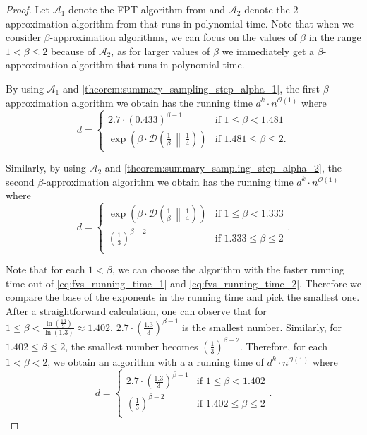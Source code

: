 \documentclass[letterpaper,11pt]{article}
\newcommand{\1}[1]{\mathds{1}\left[#1\right]}
\newcommand{\D}[2]{\mathcal{D}\left(#1\, \middle\|\,#2 \right)}
\newcommand{\Oh}{\mathcal{O}}
\begin{document}
\begin{proof}
	Let $\mathcal{A}_1$ denote the FPT algorithm from \cite{liDetectingFeedbackVertex2022} and $\mathcal{A}_2$ denote the 2-approximation algorithm from \cite{bafna2ApproximationAlgorithmUndirected1999} that runs in polynomial time.
	Note that when we consider $\beta$-approximation algorithms, we can focus on the values of
	$\beta$ in the range $1 < \beta \leq 2$ because of $\mathcal{A}_2$,
	as for larger values of $\beta$ we immediately get a $\beta$-approximation
	algorithm that runs in polynomial time.
	
	By using $\mathcal{A}_1$ and \cref{theorem:summary_sampling_step_alpha_1}, the first $\beta$-approximation algorithm we obtain
	has the running time $d^{k} \cdot n^{\Oh(1)}$ where
		\begin{equation}\label{eq:fvs_running_time_1}
			d = \begin{cases}
				2.7 \cdot \left(0.433\right) ^{\beta - 1} &\text{if } 1 \leq \beta < 1.481\\
				\exp\left( \beta \cdot \D{\frac{1}{\beta}}{\frac{1}{4}} \right) &\text{if } 1.481 \leq \beta \leq 2.
			\end{cases}
		\end{equation}
	
	Similarly, by using $\mathcal{A}_2$ and \cref{theorem:summary_sampling_step_alpha_2}, the second $\beta$-approximation algorithm we obtain has the running time
	$d^{k} \cdot n^{\Oh(1)}$ where
	\begin{equation}\label{eq:fvs_running_time_2}
		d = \begin{cases}
				 \exp\left( \beta \cdot \D{\frac{1}{\beta}}{\frac{1}{4}} \right)  &\text{if } 1 \leq \beta < 1.333\\
				 \left(\frac{1}{3}\right)^{\beta - 2} &\text{if } 1.333 \leq \beta \leq 2\\
			\end{cases}.
	\end{equation}
	
	Note that for each $1 < \beta$, we can choose the algorithm with the faster running
	time out of \eqref{eq:fvs_running_time_1} and \eqref{eq:fvs_running_time_2}.
	Therefore we compare the base of the exponents in the running time and pick the smallest one.
	After a straightforward calculation, one can observe that for $1 \leq \beta < \frac{\ln\left( \frac{13}{9} \right) }{\ln\left( 1.3 \right) } \approx 1.402$,
	$2.7 \cdot \left( \frac{1.3}{3} \right) ^{\beta - 1}$ is the smallest number. Similarly,
	for $1.402 \leq \beta \leq 2$, the smallest number becomes $\left(\frac{1}{3}\right)^{\beta - 2}$.
	Therefore,
	for each $1 < \beta < 2$,
	we obtain an algorithm with a
	a running time of $d^{k} \cdot n^{\Oh(1)}$ where
	\begin{equation}\label{eq:fvs_final_base}
		d = \begin{cases}
				2.7 \cdot \left( \frac{1.3}{3} \right) ^{\beta - 1} &\text{if } 1 \leq \beta < 1.402\\			
				 \left(\frac{1}{3}\right)^{\beta - 2} &\text{if } 1.402 \leq \beta \leq 2\\
			\end{cases}.
	\end{equation}
\end{proof}
\end{document}
